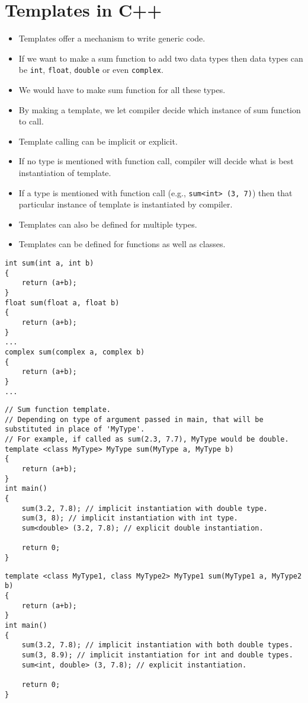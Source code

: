 \documentclass[12pt,a4paper]{article}
\begin{document}
\section{Templates in C++}
\begin{itemize}
\item Templates offer a mechanism to write generic code.
\item If we want to make a sum function to add two data types then data types can be \verb|int|, \verb|float|, \verb|double| or even \verb|complex|.
\item We would have to make sum function for all these types.
\item By making a template, we let compiler decide which instance of sum function to call.
\item Template calling can be implicit or explicit.
\item If no type is mentioned with function call, compiler will decide what is best instantiation of template.
\item If a type is mentioned with function call (e.g., \verb|sum<int> (3, 7)|) then that particular instance of template is instantiated by compiler.
\item Templates can also be defined for multiple types.
\item Templates can be defined for functions as well as classes.
\end{itemize}
\begin{lstlisting}[caption={Traditional way of writing sum function}]
int sum(int a, int b)
{
	return (a+b);
}
float sum(float a, float b)
{
	return (a+b);
}
...
complex sum(complex a, complex b)
{
	return (a+b);
}
...
\end{lstlisting}
\begin{lstlisting}[caption={Sum function template}]
// Sum function template.
// Depending on type of argument passed in main, that will be substituted in place of 'MyType'.
// For example, if called as sum(2.3, 7.7), MyType would be double.
template <class MyType> MyType sum(MyType a, MyType b)
{
	return (a+b);
}
int main()
{
	sum(3.2, 7.8); // implicit instantiation with double type.
	sum(3, 8); // implicit instantiation with int type.
	sum<double> (3.2, 7.8); // explicit double instantiation.
	
	return 0;
}
\end{lstlisting}
\begin{lstlisting}[caption={Sum function template for mixed types}]
template <class MyType1, class MyType2> MyType1 sum(MyType1 a, MyType2 b)
{
	return (a+b);
}
int main()
{
	sum(3.2, 7.8); // implicit instantiation with both double types.
	sum(3, 8.9); // implicit instantiation for int and double types.
	sum<int, double> (3, 7.8); // explicit instantiation.
	
	return 0;
}
\end{lstlisting}
\end{document}
